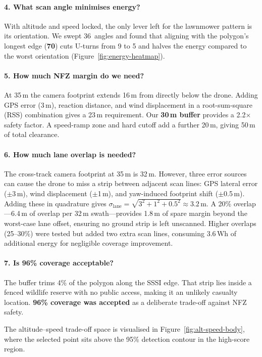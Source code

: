\paragraph{4. What scan angle minimises energy?}
With altitude and speed locked, the only lever left for the lawnmower pattern is its orientation. We swept 36~angles and found that aligning with the polygon's longest edge (\textbf{70\textdegree}) cuts U-turns from 9 to 5 and halves the energy compared to the worst orientation (Figure~\ref{fig:energy-heatmap}).

\paragraph{5. How much NFZ margin do we need?}
At 35\,m the camera footprint extends 16\,m from directly below the drone. Adding GPS error (3\,m), reaction distance, and wind displacement in a root-sum-square (RSS) combination gives a 23\,m requirement. Our \textbf{30\,m buffer} provides a 2.2$\times$ safety factor. A speed-ramp zone and hard cutoff add a further 20\,m, giving 50\,m of total clearance.

\paragraph{6. How much lane overlap is needed?}
The cross-track camera footprint at 35\,m is 32\,m. However, three error sources can cause the drone to miss a strip between adjacent scan lines: GPS lateral error ($\pm$3\,m), wind displacement ($\pm$1\,m), and yaw-induced footprint shift ($\pm$0.5\,m). Adding these in quadrature gives $\sigma_{\text{lane}} = \sqrt{3^2 + 1^2 + 0.5^2} \approx 3.2$\,m. A 20\% overlap---6.4\,m of overlap per 32\,m swath---provides 1.8\,m of spare margin beyond the worst-case lane offset, ensuring no ground strip is left unscanned. Higher overlaps (25--30\%) were tested but added two extra scan lines, consuming 3.6\,Wh of additional energy for negligible coverage improvement.

\paragraph{7. Is 96\% coverage acceptable?}
The buffer trims 4\% of the polygon along the SSSI edge. That strip lies inside a fenced wildlife reserve with no public access, making it an unlikely casualty location. \textbf{96\% coverage was accepted} as a deliberate trade-off against NFZ safety.

The altitude--speed trade-off space is visualised in Figure~\ref{fig:alt-speed-body}, where the selected point sits above the 95\% detection contour in the high-score region.

